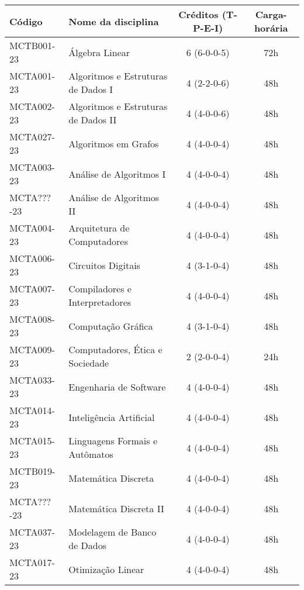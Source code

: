 \begin{table}[!h]
    \caption{Lista de disciplinas obrigatórias do BCC.}
    \label{tab:disciplinas_bcc}

    \centering
    \begin{longtable}{|l|p{}|c|c|}
        \hline
        \textbf{Código} & \textbf{Nome da disciplina} & \textbf{Créditos (T-P-E-I)} & \textbf{Carga-horária}\\
        \hline\hline
        MCTB001-23 & Álgebra Linear & 6 (6-0-0-5) & 72h \\
        \hline
        MCTA001-23 & Algoritmos e Estruturas de Dados I & 4 (2-2-0-6) & 48h \\
        \hline
        MCTA002-23 & Algoritmos e Estruturas de Dados II & 4 (4-0-0-6) & 48h \\
        \hline
        MCTA027-23 & Algoritmos em Grafos & 4 (4-0-0-4) & 48h\\
        \hline
        MCTA003-23 & Análise de Algoritmos I & 4 (4-0-0-4) & 48h \\
        \hline
        MCTA???-23 & Análise de Algoritmos II & 4 (4-0-0-4) & 48h \\
        \hline
        MCTA004-23 & Arquitetura de Computadores & 4 (4-0-0-4) & 48h \\
        \hline
        MCTA006-23 & Circuitos Digitais & 4 (3-1-0-4) & 48h \\
        \hline
        MCTA007-23 & Compiladores e Interpretadores & 4 (4-0-0-4) & 48h \\
        \hline
        MCTA008-23 & Computação Gráfica & 4 (3-1-0-4) & 48h  \\
        \hline
        MCTA009-23 & Computadores, Ética e Sociedade & 2 (2-0-0-4) & 24h \\
        \hline
        MCTA033-23 & Engenharia de Software & 4 (4-0-0-4) & 48h \\
        \hline
        MCTA014-23 & Inteligência Artificial & 4 (4-0-0-4) & 48h \\
        \hline
        MCTA015-23 & Linguagens Formais e Autômatos & 4 (4-0-0-4) & 48h \\
        \hline
        MCTB019-23 & Matemática Discreta & 4 (4-0-0-4) & 48h \\
        \hline
        MCTA???-23 & Matemática Discreta II & 4 (4-0-0-4) & 48h \\
        \hline
        MCTA037-23 & Modelagem de Banco de Dados & 4 (4-0-0-4) & 48h \\
        \hline
        MCTA017-23 & Otimização Linear & 4 (4-0-0-4) & 48h \\

\end{longtable}
\end{table}
